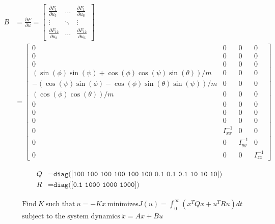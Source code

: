 \documentclass[letterpaper, preprint, paper,11pt]{AAS}	%
\begin{document}
\begin{equation}
\begin{split}
\label{eq:B}
B &= \frac{\partial F}{\partial u} = 
\begin{bmatrix} 
    \frac{\partial F_1}{\partial u_3} & \dots  & \frac{\partial F_1}{\partial u_6}\\
    \vdots & \ddots & \vdots\\
    \frac{\partial F_{12}}{\partial u_3} & \dots  & \frac{\partial F_{12}}{\partial u_6} 
\end{bmatrix}\\&=\begin{bmatrix}
         0&0&0&0\\
         0&0&0&0\\
         0&0&0&0\\
         (\sin(\phi)\sin(\psi) + \cos(\phi)\cos(\psi)\sin(\theta)) / m&0&0&0\\
         -(\cos(\psi)\sin(\phi) - \cos(\phi)\sin(\theta)\sin(\psi)) / m&0&0&0\\
         (\cos(\phi)\cos(\theta)) / m&0&0&0\\
         0&0&0&0\\
         0&0&0&0\\
         0&0&0&0\\
         0&I_{xx}^{-1}&0&0\\
         0&0&I_{yy}^{-1}&0\\
         0&0&0&I_{zz}^{-1}
\end{bmatrix}
\end{split}
\end{equation}

\begin{equation}
\label{eq:QandR}
\begin{split}
Q &= \texttt{diag([100 100 100 100 100 100 0.1 0.1 0.1 10 10 10])}\\
R &= \texttt{diag([0.1 1000 1000 1000])}
\end{split}
\end{equation}

\begin{equation}
\label{eq:LQR}
\begin{split}
&\text{Find}\  K\  \text{such that}\  u=-Kx\  \text{minimizes}
J(u)=\int_{0}^{\infty} (x^TQx+u^TRu)dt\\
&\text{subject to the system dynamics}\  \dot{x}=Ax+Bu
\end{split}
\end{equation}
\end{document}
